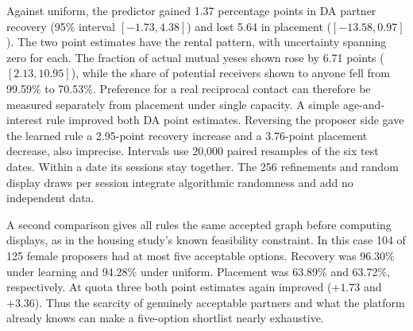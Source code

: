 Against uniform, the predictor gained 1.37 percentage points in DA partner recovery (95\% interval $[-1.73,4.38]$) and lost 5.64 in placement ($[-13.58,0.97]$). The two point estimates have the rental pattern, with uncertainty spanning zero for each. The fraction of actual mutual yeses shown rose by 6.71 points ($[2.13,10.95]$), while the share of potential receivers shown to anyone fell from 99.59\% to 70.53\%. Preference for a real reciprocal contact can therefore be measured separately from placement under single capacity. A simple age-and-interest rule improved both DA point estimates. Reversing the proposer side gave the learned rule a 2.95-point recovery increase and a 3.76-point placement decrease, also imprecise. Intervals use 20,000 paired resamples of the six test dates. Within a date its sessions stay together. The 256 refinements and random display draws per session integrate algorithmic randomness and add no independent data.

A second comparison gives all rules the same accepted graph before computing displays, as in the housing study's known feasibility constraint. In this case 104 of 125 female proposers had at most five acceptable options. Recovery was 96.30\% under learning and 94.28\% under uniform. Placement was 63.89\% and 63.72\%, respectively. At quota three both point estimates again improved ($+1.73$ and $+3.36$). Thus the scarcity of genuinely acceptable partners and what the platform already knows can make a five-option shortlist nearly exhaustive.
